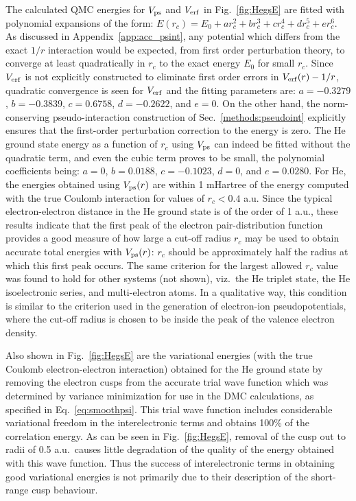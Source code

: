 The calculated QMC energies for $V_{\rm ps}$ and $V_{\rm erf}$ 
in Fig.~\ref{fig:HegsE}
are fitted with polynomial expansions of the form:
$E(r_c) = E_0 + a r_c^2 + b r_c^3 + c r_c^4 + d r_c^5 + e r_c^6$.
As discussed in Appendix~\ref{app:acc_psint}, any potential which 
differs from the exact $1/r$ interaction would be expected, from 
first order perturbation theory, to converge at least quadratically 
in $r_c$ to the exact energy $E_0$ for small $r_c$. 
Since $V_{\rm erf}$ is not explicitly 
constructed to eliminate first order errors in $V_{\rm erf}(r)-1/r$,
quadratic convergence is seen for $V_{\rm erf}$ and
the fitting parameters are: 
$a=-0.3279$, $b=-0.3839$, $c=0.6758$, $d=-0.2622$, and $e=0$.
On the other hand, the norm-conserving pseudo-interaction 
construction of Sec.~\ref{methods:pseudoint} explicitly ensures that 
the first-order perturbation correction to the energy is zero.
The He ground state energy as a function of $r_c$ using $V_{\rm ps}$ 
can indeed be fitted without the quadratic term, and even the cubic term 
proves to be small,
the polynomial coefficients being:
$a=0$, $b=0.0188$, $c=-0.1023$, $d=0$, and $e=0.0280$.
For He, the energies obtained using $V_{\rm ps}(r)$ are within 1 mHartree 
of the energy computed with the true Coulomb interaction for values
of $r_c < 0.4$ a.u. 
Since the typical electron-electron distance in the He ground state 
is of the order of 1 a.u., these results indicate that the first peak 
of the electron pair-distribution function provides a good measure 
of how large a cut-off radius $r_c$ may be used to obtain accurate 
total energies with $V_{\rm ps}(r)$: 
$r_c$ should be approximately half the radius at which this first 
peak occurs.
The same criterion for the largest allowed $r_c$ value was found to 
hold for other systems (not shown), viz.\ the He triplet state, the 
He isoelectronic series, and multi-electron atoms.
In a qualitative way, this condition is similar to the 
criterion used in the generation of electron-ion pseudopotentials, 
where the cut-off radius is chosen to be inside the peak of the 
valence electron density.

Also shown in Fig.~\ref{fig:HegsE} are the variational energies 
(with the true Coulomb electron-electron interaction) obtained 
for the He ground state by removing the electron cusps from the 
accurate trial wave function which was determined by variance 
minimization for use in the DMC calculations, as specified in 
Eq.~\ref{eq:smoothpsi}. 
This trial wave function includes considerable variational freedom 
in the interelectronic terms and obtains 100\% of the correlation 
energy. 
As can be seen in Fig.~\ref{fig:HegsE}, removal of the cusp out 
to radii of 0.5 a.u.\ causes little degradation of the 
quality of the energy obtained with this wave function. 
Thus the success of interelectronic terms in obtaining good 
variational energies is not primarily due to their description 
of the short-range cusp behaviour. 


